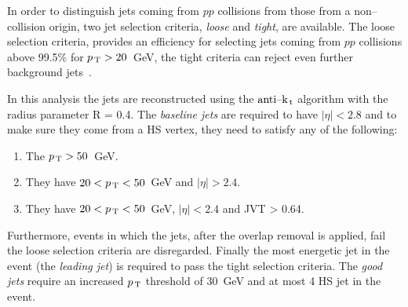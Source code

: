 In order to distinguish jets coming from $pp$ collisions from those from a
non--collision origin, two jet selection criteria, \emph{loose} and \emph{tight},
are available. The loose selection criteria, provides an efficiency for
selecting jets coming from $pp$ collisions above 99.5\% for $p_\mathrm{\, T} > 20$~GeV, the
tight criteria can reject even further background jets~\cite{JetEff}.

In this analysis the jets are reconstructed using the $\text{anti--k}_\mathrm{\, t}$ algorithm with
the radius parameter R = 0.4. The \emph{baseline jets} are required to have
$|\eta| < 2.8$ and to make sure they come from a HS vertex, they need to satisfy
any of the following:
\begin{enumerate}[A -]
  \item The $p_\mathrm{\, T} > 50$~GeV.
  \item They have $20 < p_\mathrm{\, T} < 50$~GeV and $|\eta| > 2.4$.
  \item They have $20 < p_\mathrm{\, T} < 50$~GeV, $|\eta| < 2.4$ and JVT > 0.64.
\end{enumerate}
Furthermore, events in which the jets, after the overlap removal is applied,
fail the loose selection criteria are disregarded. Finally the most energetic
jet in the event (the \emph{leading jet}) is required to pass the tight
selection criteria. The \emph{good jets} require an increased $p_\mathrm{\, T}$ threshold of
30~GeV and at most 4 HS jet in the event.

